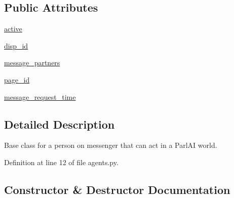 \subsection*{Public Attributes}
\begin{DoxyCompactItemize}
\item 
\hyperlink{classparlai_1_1chat__service_1_1services_1_1messenger_1_1agents_1_1MessengerAgent_a5f3a25e6a3cfed1926bd58e1bea24b43}{active}
\item 
\hyperlink{classparlai_1_1chat__service_1_1services_1_1messenger_1_1agents_1_1MessengerAgent_a43c5b504f93f73a50ef165f0a51c0720}{disp\+\_\+id}
\item 
\hyperlink{classparlai_1_1chat__service_1_1services_1_1messenger_1_1agents_1_1MessengerAgent_a84d6c2e63fca234f110a9ac24c198288}{message\+\_\+partners}
\item 
\hyperlink{classparlai_1_1chat__service_1_1services_1_1messenger_1_1agents_1_1MessengerAgent_aefc5070a7daf467a856cecb4be055d84}{page\+\_\+id}
\item 
\hyperlink{classparlai_1_1chat__service_1_1services_1_1messenger_1_1agents_1_1MessengerAgent_a1705cf3fbbe2cced5ebc7c6a2e51dbec}{message\+\_\+request\+\_\+time}
\end{DoxyCompactItemize}


\subsection{Detailed Description}
\begin{DoxyVerb}Base class for a person on messenger that can act in a ParlAI world.
\end{DoxyVerb}
 

Definition at line 12 of file agents.\+py.



\subsection{Constructor \& Destructor Documentation}
\mbox{\label{classparlai_1_1chat__service_1_1services_1_1messenger_1_1agents_1_1MessengerAgent_a5ddfb3f99c66a6f6c439a3ab2c6e23d7}} 
